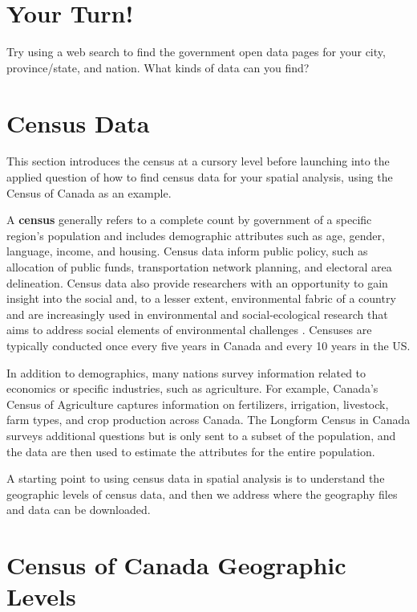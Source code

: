 \documentclass[
]{book}
\begin{document}
\hypertarget{your-turn-1}{%
\section*{Your Turn!}\label{your-turn-1}}

Try using a web search to find the government open data pages for your city, province/state, and nation. What kinds of data can you find?

\hypertarget{census-data}{%
\section{Census Data}\label{census-data}}

This section introduces the census at a cursory level before launching into the applied question of how to find census data for your spatial analysis, using the Census of Canada as an example.

A \textbf{census} generally refers to a complete count by government of a specific region's population and includes demographic attributes such as age, gender, language, income, and housing. Census data inform public policy, such as allocation of public funds, transportation network planning, and electoral area delineation. Census data also provide researchers with an opportunity to gain insight into the social and, to a lesser extent, environmental fabric of a country and are increasingly used in environmental and social-ecological research that aims to address social elements of environmental challenges \citep{tomscha_guide_2016} \citep{biggs_routledge_2021}. Censuses are typically conducted once every five years in Canada and every 10 years in the US.

In addition to demographics, many nations survey information related to economics or specific industries, such as agriculture. For example, Canada's Census of Agriculture captures information on fertilizers, irrigation, livestock, farm types, and crop production across Canada. The Longform Census in Canada surveys additional questions but is only sent to a subset of the population, and the data are then used to estimate the attributes for the entire population.

A starting point to using census data in spatial analysis is to understand the geographic levels of census data, and then we address where the geography files and data can be downloaded.

\hypertarget{census-of-canada-geographic-levels}{%
\section{Census of Canada Geographic Levels}\label{census-of-canada-geographic-levels}}
\end{document}
